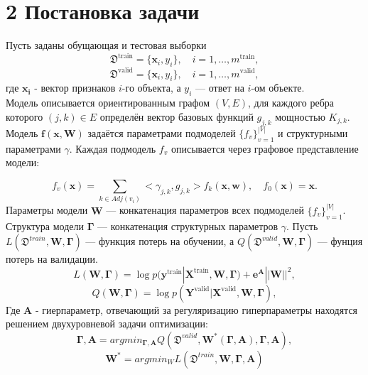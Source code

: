 \documentclass[12pt,twoside]{article}
\begin{document}
\section{2 Постановка задачи}
Пусть заданы обущающая и тестовая выборки
$$
\mathfrak{D}^{\text{train}} = \{\mathbf{x}_i, y_i\}, \quad i=1,\dots,m^{\text{train}},
$$
$$
\mathfrak{D}^{\text{valid}} = \{\mathbf{x}_i, y_i\}, \quad i=1,\dots,m^{\text{valid}},
$$
где $\mathbf{x_i}$ - вектор признаков $i$-го объекта, а $y_i$ --- ответ на $i$-ом объекте.\\
Модель описывается ориентированным графом $(V, E)$,  для каждого ребра которого $(j, k) \in E$ определён вектор базовых функций $g_{j, k}$ мощностью $K_{j, k}$. Модель $\textbf{f}(\textbf{x}, \textbf{W})$ задаётся параметрами подмоделей $\{f_{v}\}_{v = 1}^{|V|}$ и структурными параметрами $\gamma$.  
	Каждая подмодель $f_{v}$ описывается через графовое представление модели:
	
	 $$f_{v}(\textbf{x}) = \sum\limits_{k \in Adj(v_i)} <\gamma_{j, k}, g_{j, k}>f_{k}(\textbf{x}, \textbf{w}), \quad f_{0}(\textbf{x}) = \textbf{x}.$$ 
	Параметры модели $\textbf{W}$ --- конкатенация параметров всех подмоделей $\{f_{v}\}_{v = 1}^{|V|}$.\\
	Структура модели $\boldsymbol{\Gamma}$ --- конкатенация структурных параметров $\gamma$.
Пусть $L(\mathfrak{D}^{train},\mathbf{W},\boldsymbol{\Gamma})$ --- функция потерь на обучении, а $Q(\mathfrak{D}^{valid},\mathbf{W},\boldsymbol{\Gamma})$ --- фунция потерь на валидации.
$$L (\mathbf{W}, \boldsymbol{\Gamma})= \log p(\mathbf{y}^\text{train}|\mathbf{X}^\text{train}, \mathbf{W}, \boldsymbol{\Gamma}) + \boldsymbol{e}^{\mathbf{A}}||\mathbf{W}||^2,
$$
$$Q (\mathbf{W}, \boldsymbol{\Gamma})= \log p(\mathbf{Y}^\text{valid}|\mathbf{X}^\text{valid}, \mathbf{W}, \boldsymbol{\Gamma}),
$$
Где $\mathbf{A}$ - гиерпараметр, отвечающий за регуляризацию
гиперпараметры находятся решением двухуровневой задачи оптимизации:
$$\boldsymbol{\Gamma},\mathbf{A} = argmin_{\boldsymbol{\Gamma},\mathbf{A}} Q(\mathfrak{D}^{valid},\mathbf{W^*(\boldsymbol{\Gamma},\mathbf{A})},\boldsymbol{\Gamma},\mathbf{A}),$$
$$\mathbf{W^*} = argmin_W L(\mathfrak{D}^{train},\mathbf{W},\boldsymbol{\Gamma},\mathbf{A})$$


\end{document}
